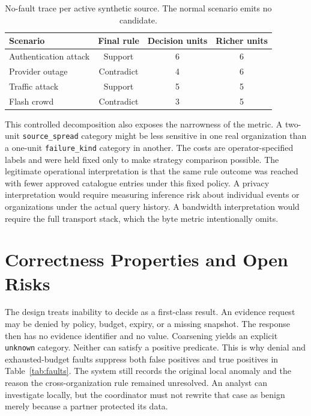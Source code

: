 \documentclass[conference,letterpaper]{IEEEtran}
\begin{document}
\begin{table}[t]
\centering\caption{No-fault trace per active synthetic source. The normal scenario emits no candidate.}
\label{tab:trace}\scriptsize
\begin{tabular}{lccc}\hline
Scenario & Final rule & Decision units & Richer units \\\hline
Authentication attack & Support & 6 & 6\\
Provider outage & Contradict & 4 & 6\\
Traffic attack & Support & 5 & 5\\
Flash crowd & Contradict & 3 & 5\\\hline
\end{tabular}
\end{table}

This controlled decomposition also exposes the narrowness of the metric. A two-unit \texttt{source\_spread} category might be less sensitive in one real organization than a one-unit \texttt{failure\_kind} category in another. The costs are operator-specified labels and were held fixed only to make strategy comparison possible. The legitimate operational interpretation is that the same rule outcome was reached with fewer approved catalogue entries under this fixed policy. A privacy interpretation would require measuring inference risk about individual events or organizations under the actual query history. A bandwidth interpretation would require the full transport stack, which the byte metric intentionally omits.

\section{Correctness Properties and Open Risks}
The design treats inability to decide as a first-class result. An evidence request may be denied by policy, budget, expiry, or a missing snapshot. The response then has no evidence identifier and no value. Coarsening yields an explicit \texttt{unknown} category. Neither can satisfy a positive predicate. This is why denial and exhausted-budget faults suppress both false positives and true positives in Table~\ref{tab:faults}. The system still records the original local anomaly and the reason the cross-organization rule remained unresolved. An analyst can investigate locally, but the coordinator must not rewrite that case as benign merely because a partner protected its data.
\end{document}
